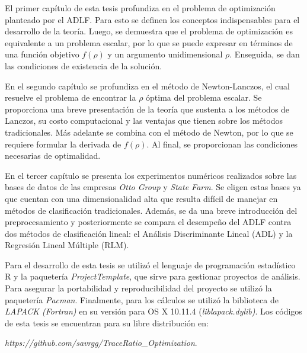 El primer capítulo de esta tesis profundiza en el problema de optimización planteado por el ADLF. Para esto se definen los conceptos indispensables para el desarrollo de la teoría. Luego, se demuestra que el problema de optimización es equivalente a un problema escalar, por lo que se puede expresar en términos de una función objetivo $f(\rho)$ y un argumento unidimensional $\rho$. Enseguida, se dan las condiciones de existencia de la solución.

En el segundo capítulo se profundiza en el método de Newton-Lanczos, el cual resuelve el problema de encontrar la $\rho$ óptima del problema escalar. Se proporciona una breve presentación de la teoría que sustenta a los métodos de Lanczos, su costo computacional y las ventajas que tienen sobre los métodos tradicionales. Más adelante se combina con el método de Newton, por lo que se requiere formular la derivada de $f(\rho)$. Al final, se proporcionan las condiciones necesarias de optimalidad.

En el tercer capítulo se presenta los experimentos numéricos realizados sobre las bases de datos de las empresas \textit{Otto Group} y \textit{State Farm}. Se eligen estas bases ya que cuentan con una dimensionalidad alta que resulta difícil de manejar en métodos de clasificación tradicionales. Además, se da una breve introducción del preprocesamiento y posteriormente se compara el desempeño del ADLF contra dos métodos de clasificación lineal: el Análisis Discriminante Lineal (ADL) y la Regresión Lineal Múltiple (RLM).

Para el desarrollo de esta tesis se utilizó el lenguaje de programación estadístico R y la paquetería \textit{ProjectTemplate}, que sirve para gestionar proyectos de análisis. Para asegurar la portabilidad y reproducibilidad del proyecto se utilizó la paquetería \textit{Pacman}. Finalmente, para los cálculos se utilizó la biblioteca de \textit{LAPACK (Fortran)} en su versión para OS X 10.11.4 (\textit{liblapack.dylib)}. Los códigos de esta tesis se encuentran para su libre distribución en:

\textit{https://github.com/savrgg/TraceRatio\_Optimization}.

